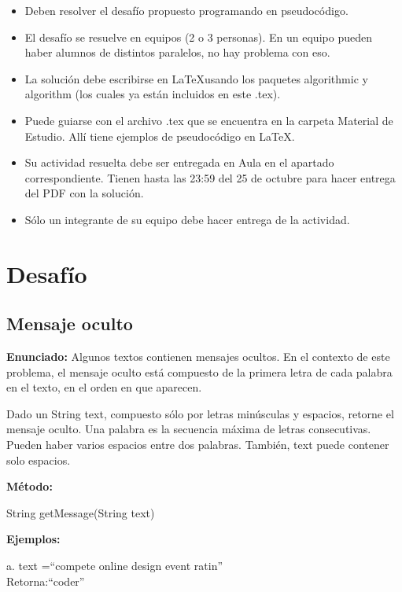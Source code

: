 \documentclass[letterpaper,10pt]{article}
\begin{document}
\begin{itemize}
    \item Deben resolver el desafío propuesto programando en pseudocódigo.
    \item El desafío se resuelve en equipos (2 o 3 personas). En un equipo pueden haber alumnos de distintos paralelos, no hay problema con eso.
    \item La solución debe escribirse en \LaTeX usando los paquetes algorithmic y algorithm (los cuales ya están incluidos en este .tex).
    \item Puede guiarse con el archivo .tex que se encuentra en la carpeta Material de Estudio. Allí tiene ejemplos de pseudocódigo en \LaTeX.
    \item Su actividad resuelta debe ser entregada en Aula en el apartado correspondiente. Tienen hasta las 23:59 del 25 de octubre para hacer entrega del PDF con la solución.
    \item Sólo un integrante de su equipo debe hacer entrega de la actividad.
\end{itemize}


\section{Desafío}
\subsection{Mensaje oculto}

\textbf{Enunciado:} Algunos textos contienen mensajes ocultos. En el contexto de este problema, el mensaje oculto está compuesto de la primera letra de cada palabra en el texto, en el orden en que aparecen.

Dado un String text, compuesto sólo por letras minúsculas y espacios, retorne el mensaje oculto. Una palabra es la secuencia máxima de letras consecutivas. Pueden haber varios espacios entre dos palabras. También, text puede contener solo espacios.
\vspace{0.5cm}

\textbf{Método:}
\begin{center}
    String getMessage(String text)
\end{center}

\textbf{Ejemplos:}
\vspace{0.5cm}

a.	text =``compete online design event ratin''\\ Retorna:``coder''
\vspace{0.5cm}
\end{document}
